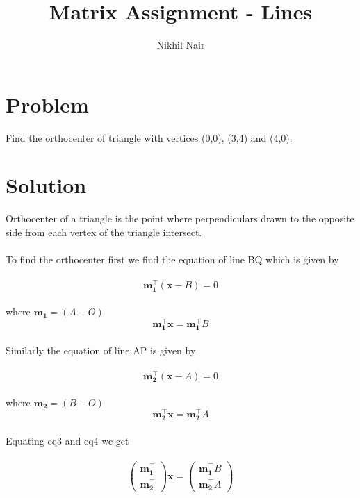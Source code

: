 \documentclass[journal,12pt,twocolumn]{IEEEtran}
\title{\mytitle}
\title{
Matrix Assignment - Lines
}
\author{Nikhil Nair}
\newcommand{\myvec}[1]{\ensuremath{\begin{pmatrix}#1\end{pmatrix}}}
\let\vec\mathbf
\begin{document}
\maketitle
\tableofcontents
\bigskip


\section{\textbf{Problem}}
Find the orthocenter of triangle with vertices (0,0), (3,4) and (4,0).\\


\section{\textbf{Solution}}
Orthocenter of a triangle is the point where perpendiculars drawn to the opposite side from each vertex of the triangle intersect.   \\
\\
To find the orthocenter first we find the equation of line BQ which is given by\\
\\
\begin{equation}
 \vec{m_1^{\top}}(\vec{x}-B) = 0   \label{eq-1}
\end{equation}
\\
where $\vec{m_1} = (A-O)$ 
\\

\begin{equation}
 \vec{m_1^{\top}x} = \vec{m_1^{\top}}B   \label{eq-2}
\end{equation}
\\
Similarly the equation of line AP is given by\\
\\
\begin{equation}
 \vec{m_2^{\top}}(\vec{x}-A) = 0   \label{eq-3}
\end{equation}
\\
where $\vec{m_2} = (B-O)$ 
\\

\begin{equation}
 \vec{m_2^{\top}x} = \vec{m_2^{\top}}A   \label{eq-4}
\end{equation}
\\
 Equating eq3 and eq4 we get
\\
\\
\begin{equation}
\myvec{\vec{m_1^{\top}} \\ \vec{m_2^{\top}}}\vec{x} = \myvec{\vec{ m_1^{\top}}B \\ \vec{m_2^{\top}}A}
\end{equation}
\\
\\
\end{document}
